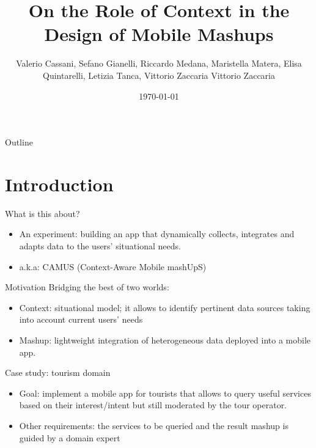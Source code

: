 \documentclass[smaller]{beamer}
\author{Valerio Cassani, Sefano Gianelli, Riccardo Medana, Maristella Matera, Elisa Quintarelli, Letizia Tanca, Vittorio Zaccaria Vittorio Zaccaria}
\date{\today}
\title{On the Role of Context in the Design of Mobile Mashups}
\begin{document}
\maketitle
\begin{frame}{Outline}
\tableofcontents
\end{frame}


\section{Introduction}
\label{sec:orgheadline4}
\begin{frame}[label={sec:orgheadline1}]{What is this about?}
\begin{itemize}
\item \alert{An experiment}: building an app that dynamically collects, integrates and adapts data to the users’ situational needs.

\item a.k.a: \alert{CAMUS} (Context-Aware Mobile mashUpS)
\end{itemize}
\end{frame}

\begin{frame}[label={sec:orgheadline2}]{Motivation}
Bridging the best of two worlds:

\begin{itemize}
\item \alert{Context}: situational model; it allows to  
identify pertinent data sources taking into account current users’ needs

\item \alert{Mashup}: lightweight integration of heterogeneous data deployed into a mobile
app.
\end{itemize}
\end{frame}

\begin{frame}[label={sec:orgheadline3}]{Case study: tourism domain}
\begin{itemize}
\item \alert{Goal}: implement a mobile app for tourists that allows to query useful
services based on their interest/intent but still moderated by the tour operator.

\item \alert{Other requirements}: the services to be queried and the result mashup is guided by a
domain expert
\end{itemize}
\end{frame}
\end{document}

